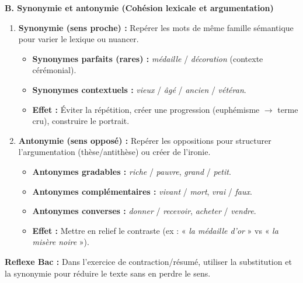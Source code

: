\documentclass[11pt]{article}
\begin{document}
\begin{methode}
\textbf{B. Synonymie et antonymie (Cohésion lexicale et argumentation)}
\begin{enumerate}
    \item \textbf{Synonymie (sens proche) :} Repérer les mots de même famille sémantique pour varier le lexique ou nuancer.
    \begin{itemize}
        \item \textbf{Synonymes parfaits (rares) :} \emph{médaille} / \emph{décoration} (contexte cérémonial).
        \item \textbf{Synonymes contextuels :} \emph{vieux} / \emph{âgé} / \emph{ancien} / \emph{vétéran}.
        \item \textbf{Effet :} Éviter la répétition, créer une progression (euphémisme $\to$ terme cru), construire le portrait.
    \end{itemize}
    \item \textbf{Antonymie (sens opposé) :} Repérer les oppositions pour structurer l'argumentation (thèse/antithèse) ou créer de l'ironie.
    \begin{itemize}
        \item \textbf{Antonymes gradables :} \emph{riche} / \emph{pauvre}, \emph{grand} / \emph{petit}.
        \item \textbf{Antonymes complémentaires :} \emph{vivant} / \emph{mort}, \emph{vrai} / \emph{faux}.
        \item \textbf{Antonymes converses :} \emph{donner} / \emph{recevoir}, \emph{acheter} / \emph{vendre}.
        \item \textbf{Effet :} Mettre en relief le contraste (ex : « \emph{la médaille d'or} » vs « \emph{la misère noire} »).
    \end{itemize}
\end{enumerate}
\textbf{Reflexe Bac :} Dans l'exercice de contraction/résumé, utiliser la substitution et la synonymie pour réduire le texte sans en perdre le sens.
\end{methode}
\end{document}
